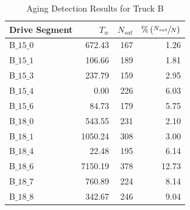 \documentclass[subscriptcorrection,upint,varvw,barcolor=Goldenrod3,mathalfa=cal=euler,balance,hyphenate,french,pdf-a]{asmejour}
\newcommand{\lr}[1]{\left( #1 \right)}
\begin{document}
\begin{table}[H]
        \centering
        \caption{Aging Detection Results for Truck B}
        \label{tab::mes_aging_res}
        \begin{tabular}{l r r r}
                \hline \hline
                Drive Segment & $T_w$   & $N_{sat}$ & $\% \lr{ \sfrac{N_{sat}}{N} }$ \\ \hline \hline
                B$\_15\_0$    & 672.43  & 167       & 1.26                           \\
                B$\_15\_1$    & 106.66  & 189       & 1.81                           \\
                B$\_15\_3$    & 237.79  & 159       & 2.95                           \\
                B$\_15\_4$    & 0.00    & 226       & 6.03                           \\
                B$\_15\_6$    & 84.73   & 179       & 5.75                           \\ \hline
                B$\_18\_0$    & 543.55  & 231       & 2.10                           \\
                B$\_18\_1$    & 1050.24 & 308       & 3.00                           \\
                B$\_18\_4$    & 22.48   & 195       & 6.14                           \\
                B$\_18\_6$    & 7150.19 & 378       & 12.73                          \\
                B$\_18\_7$    & 760.89  & 224       & 8.14                           \\
                B$\_18\_8$    & 342.67  & 246       & 9.04                           \\
                \hline \hline
        \end{tabular}
\end{table}
\end{document}
